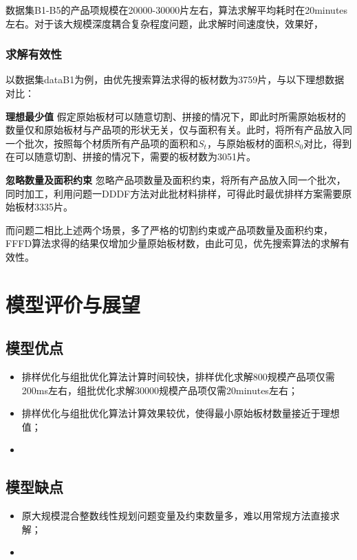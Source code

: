 \documentclass[bwprint]{gmcmthesis}
\begin{document}
	数据集B1-B5的产品项规模在20000-30000片左右，算法求解平均耗时在20minutes左右。对于该大规模深度耦合复杂程度问题，此求解时间速度快，效果好，
		
\subsubsection{求解有效性}

以数据集dataB1为例，由优先搜索算法求得的板材数为3759片，与以下理想数据对比：

\textbf{理想最少值} \quad 假定原始板材可以随意切割、拼接的情况下，即此时所需原始板材的数量仅和原始板材与产品项的形状无关，仅与面积有关。此时，将所有产品放入同一个批次，按照每个材质所有产品项的面积和$S_t$，与原始板材的面积$S_0$对比，得到在可以随意切割、拼接的情况下，需要的板材数为3051片。

\textbf{忽略数量及面积约束} \quad 忽略产品项数量及面积约束，将所有产品放入同一个批次，同时加工，利用问题一DDDF方法对此批材料排样，可得此时最优排样方案需要原始板材3335片。


而问题二相比上述两个场景，多了严格的切割约束或产品项数量及面积约束，FFFD算法求得的结果仅增加少量原始板材数，由此可见，优先搜索算法的求解有效性。



\section{模型评价与展望}
\subsection{模型优点}
\begin{itemize}
    \item 排样优化与组批优化算法计算时间较快，排样优化求解800规模产品项仅需200ms左右，组批优化求解30000规模产品项仅需20minutes左右；
    \item 排样优化与组批优化算法计算效果较优，使得最小原始板材数量接近于理想值；
    \item 
\end{itemize}
\subsection{模型缺点}
\begin{itemize}
    \item 原大规模混合整数线性规划问题变量及约束数量多，难以用常规方法直接求解；
    \item 
\end{itemize}
\end{document}
